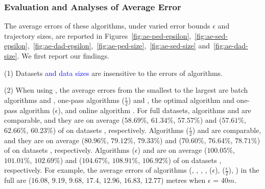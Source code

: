 



\subsubsection{Evaluation and Analyses of Average Error}
\label{sec-ae}
The average errors of these algorithms, under varied error bounds $\epsilon$ and trajectory sizes, are reported in Figures~\ref{fig:ae-ped-epsilon},~\ref{fig:ae-sed-epsilon},~\ref{fig:ae-dad-epsilon},~\ref{fig:ae-ped-size},~\ref{fig:ae-sed-size} and~\ref{fig:ae-dad-size}.
We first report our findings.

\sstab (1) {Datasets \textcolor{blue}{and data sizes} are insensitive to the errors of \lsa algorithms.}

\sstab (2) When using \ped, the average errors from the smallest
to the largest are batch algorithms \tpa and \dpa, one-pass
algorithms \siped($\frac{\epsilon}{2}$) and \operb, the optimal algorithm \opt and one-pass algorithm \siped(${\epsilon}$), and online algorithm \bqsa.
%
For full datasets, algorithms \tpa and \dpa are comparable, and they are on average ($58.69\%$, $61.34\%$,
$57.57\%$) and ($57.61\%$, $62.66\%$, $60.23\%$) of \opt on datasets \dSets, respectively.
Algorithms \siped($\frac{\epsilon}{2}$) and \operb are comparable, and they are on average
($80.96\%$, $79.12\%$, $79.33\%$) and ($70.60\%$, $76.64\%$, $78.71\%$) of \opt on datasets \dSets, respectively.
%
Algorithms \siped(${\epsilon}$) and \bqsa are on average ($100.05\%$, $101.01\%$, $102.69\%$) and ($104.67\%$, $108.91\%$, $106.92\%$) of \opt on datasets \dSets, respectively.
For example, the average errors of algorithms
(\opt, \tpa, \dpa, \bqsa, \siped(${\epsilon}$), \siped($\frac{\epsilon}{2}$), \operb ) in the full \mopsi are ($16.08$, $9.19$, $9.68$, $17.4$, $12.96$, $16.83$, $12.77$) metres when $\epsilon$ = $40m$.

